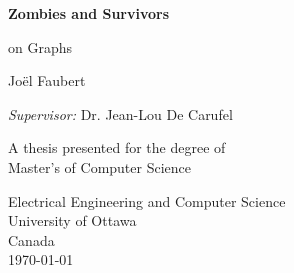 \begin{titlepage}
   \begin{center}
       \vspace*{1cm}

       \textbf{Zombies and Survivors}

       \vspace{0.5cm}
        on Graphs

       \vspace{1.5cm}

       Jo\"el Faubert
       
       \textit{Supervisor:} Dr. Jean-Lou De Carufel

       \vfill

       A thesis presented for the degree of\\
       Master's of Computer Science

       \vspace{0.8cm}


       Electrical Engineering and Computer Science\\
       University of Ottawa\\
       Canada\\
       \today

   \end{center}
\end{titlepage}
